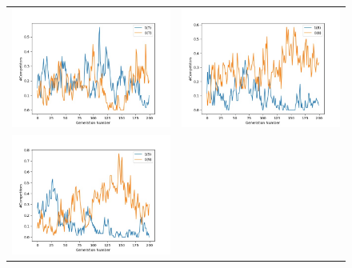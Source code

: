 \documentclass{article}
\begin{document}
\begin{figure}[H]
\begin{adjustbox}{width=0.6\paperwidth}
\begin{tabular}{c c}
			\includegraphics{Codes/Problem_2 Construction_2/Comp_7.jpg} & \includegraphics{Codes/Problem_2 Construction_2/Comp_8.jpg} \\
			\includegraphics{Codes/Problem_2 Construction_2/Comp_9.jpg}&

\end{tabular}
\end{adjustbox}
\end{figure}
\end{document}
